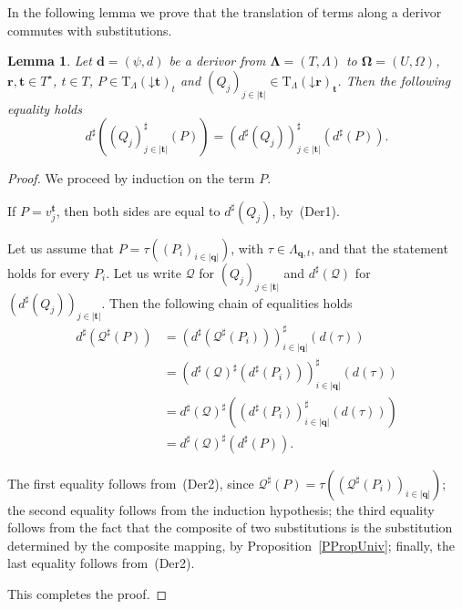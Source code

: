\documentclass[a4paper, reqno
]{amsart}
\newcommand{\bb}[1]{\ensuremath{\lvert #1 \rvert}}
\newcommand{\vs}[1]{\mathbin{\downarrow}#1}
\newcommand{\sig}[1]{\mathbf{#1}}             %
\theoremstyle{plain}
\newtheorem{lemma}[theorem]{Lemma}
\theoremstyle{definition}
\begin{document}
In the following lemma we prove that the translation of terms along a derivor commutes with substitutions.

\begin{lemma}\label{LDerSubst}
Let $\mathbf{d}=(\psi,d)$ be a derivor from $\sig{\Lambda}=(T,\Lambda)$ to $\sig{\Omega}=(U,\Omega)$, $\mathbf{r},\mathbf{t}\in T^{\star}$, $t\in T$, $P\in\mathrm{T}_{\Lambda}(\vs{\mathbf{t}})_{t}$ and $(Q_{j})_{j\in\bb{\mathbf{t}}}\in\mathrm{T}_{\Lambda}(\vs{\mathbf{r}})_{\mathbf{t}}$.
Then the following equality holds
$$
d^{\sharp}\left((Q_{j})^{\sharp}_{j\in\bb{\mathbf{t}}}(P)\right)=\left(d^{\sharp}(Q_{j})\right)^{\sharp}_{j\in\bb{\mathbf{t}}}\left(d^{\sharp}(P)\right).
$$
\end{lemma}
\begin{proof}
We proceed by induction on the term $P$.

If $P=v^{\mathbf{t}}_{j}$, then both sides are equal to $d^{\sharp}(Q_{j})$, by~(Der1).

Let us assume that $P=\tau((P_{i})_{i\in\bb{\mathbf{q}}})$, with $\tau\in\Lambda_{\mathbf{q},t}$, and that the statement holds for every $P_{i}$.
Let us write $\mathcal{Q}$ for $(Q_{j})_{j\in\bb{\mathbf{t}}}$ and $d^{\sharp}(\mathcal{Q})$ for $(d^{\sharp}(Q_{j}))_{j\in\bb{\mathbf{t}}}$.
Then the following chain of equalities holds
\begin{align*}
d^{\sharp}\left(\mathcal{Q}^{\sharp}(P)\right)
&=
\left(d^{\sharp}\left(\mathcal{Q}^{\sharp}(P_{i})\right)\right)^{\sharp}_{i\in\bb{\mathbf{q}}}\left(d(\tau)\right)
\tag{1}
\\&=
\left(d^{\sharp}(\mathcal{Q})^{\sharp}\left(d^{\sharp}(P_{i})\right)\right)^{\sharp}_{i\in\bb{\mathbf{q}}}\left(d(\tau)\right)
\tag{2}
\\&=
d^{\sharp}(\mathcal{Q})^{\sharp}\left(\left(d^{\sharp}(P_{i})\right)^{\sharp}_{i\in\bb{\mathbf{q}}}\left(d(\tau)\right)\right)
\tag{3}
\\&=
d^{\sharp}(\mathcal{Q})^{\sharp}\left(d^{\sharp}(P)\right).
\tag{4}
\end{align*}

The first equality follows from~(Der2), since $\mathcal{Q}^{\sharp}(P)=\tau((\mathcal{Q}^{\sharp}(P_{i}))_{i\in\bb{\mathbf{q}}})$; the second equality follows from the induction hypothesis; the third equality follows from the fact that the composite of two substitutions is the substitution determined by the composite mapping, by Proposition~\ref{PPropUniv}; finally, the last equality follows from~(Der2).

This completes the proof.
\end{proof}
\end{document}
